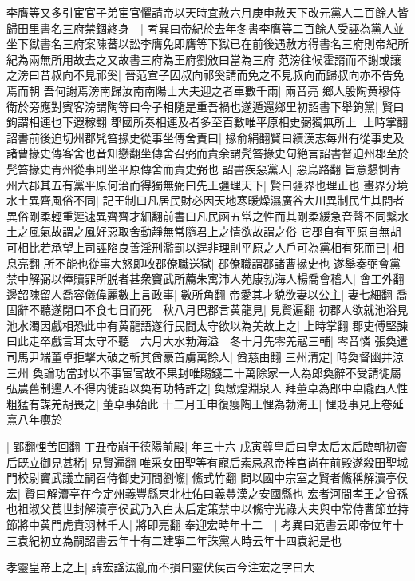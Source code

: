 李膺等又多引宦官子弟宦官懼請帝以天時宜赦六月庚申赦天下改元黨人二百餘人皆歸田里書名三府禁錮終身　|{
	考異曰帝紀於去年冬書李膺等二百餘人受誣為黨人並坐下獄書名三府案陳蕃以訟李膺免即膺等下獄已在前後遇赦方得書名三府則帝紀所紀為兩無所用故去之又故書三府為王府劉攽曰當為三府}
范滂往候霍諝而不謝或讓之滂曰昔叔向不見祁奚|{
	晉范宣子囚叔向祁奚請而免之不見叔向而歸叔向亦不告免焉而朝}
吾何謝焉滂南歸汝南南陽士大夫迎之者車數千兩|{
	兩音亮}
鄉人殷陶黄穆侍衛於旁應對賓客滂謂陶等曰今子相隨是重吾禍也遂遁還鄉里初詔書下舉鉤黨|{
	賢曰鉤謂相連也下遐稼翻}
郡國所奏相連及者多至百數唯平原相史弼獨無所上|{
	上時掌翻}
詔書前後迫切州郡髠笞掾史從事坐傳舍責曰|{
	掾俞絹翻賢曰續漢志每州有從事史及諸曹掾史傳客舍也音知戀翻坐傳舍召弼而責余謂髠笞掾史句絶言詔書督迫州郡至於髠笞掾史青州從事則坐平原傳舍而責史弼也}
詔書疾惡黨人|{
	惡烏路翻}
旨意懇惻青州六郡其五有黨平原何治而得獨無弼曰先王疆理天下|{
	賢曰疆界也理正也}
畫界分境水土異齊風俗不同|{
	記王制曰凡居民財必因天地寒暖燥濕廣谷大川異制民生其間者異俗剛柔輕重遲速異齊齊才細翻前書曰凡民函五常之性而其剛柔緩急音聲不同繫水土之風氣故謂之風好惡取舍動靜無常隨君上之情欲故謂之俗}
它郡自有平原自無胡可相比若承望上司誣陷良善淫刑濫罰以逞非理則平原之人戶可為黨相有死而已|{
	相息亮翻}
所不能也從事大怒即收郡僚職送獄|{
	郡僚職謂郡諸曹掾史也}
遂舉奏弼會黨禁中解弼以俸贖罪所脱者甚衆竇武所薦朱㝢沛人苑康勃海人楊喬會稽人|{
	會工外翻}
邊韶陳留人喬容儀偉麗數上言政事|{
	數所角翻}
帝愛其才貌欲妻以公主|{
	妻七細翻}
喬固辭不聽遂閉口不食七日而死　秋八月巴郡言黄龍見|{
	見賢遍翻}
初郡人欲就池浴見池水濁因戲相恐此中有黄龍語遂行民間太守欲以為美故上之|{
	上時掌翻}
郡吏傅堅諫曰此走卒戲言耳太守不聽　六月大水勃海溢　冬十月先零羌寇三輔|{
	零音憐}
張奐遣司馬尹端董卓拒擊大破之斬其酋豪首虜萬餘人|{
	酋慈由翻}
三州清定|{
	時奐督幽并涼三州}
奐論功當封以不事宦官故不果封唯賜錢二十萬除家一人為郎奐辭不受請徙屬弘農舊制邊人不得内徙詔以奐有功特許之|{
	奐燉煌淵泉人}
拜董卓為郎中卓隴西人性粗猛有謀羌胡畏之|{
	董卓事始此}
十二月壬申復癭陶王悝為勃海王|{
	悝貶事見上卷延熹八年癭於}


|{
	郢翻悝苦回翻}
丁丑帝崩于德陽前殿|{
	年三十六}
戊寅尊皇后曰皇太后太后臨朝初竇后既立御見甚稀|{
	見賢遍翻}
唯采女田聖等有寵后素忌忍帝梓宫尚在前殿遂殺田聖城門校尉竇武議立嗣召侍御史河間劉鯈|{
	鯈式竹翻}
問以國中宗室之賢者鯈稱解瀆亭侯宏|{
	賢曰解瀆亭在今定州義豐縣東北杜佑曰義豐漢之安國縣也}
宏者河間孝王之曾孫也祖淑父萇世封解瀆亭侯武乃入白太后定策禁中以鯈守光祿大夫與中常侍曹節並持節將中黄門虎賁羽林千人|{
	將即亮翻}
奉迎宏時年十二　|{
	考異曰范書云即帝位年十三袁紀初立為嗣詔書云年十有二建寧二年誅黨人時云年十四袁紀是也}


孝靈皇帝上之上|{
	諱宏諡法亂而不損曰靈伏侯古今注宏之字曰大}


